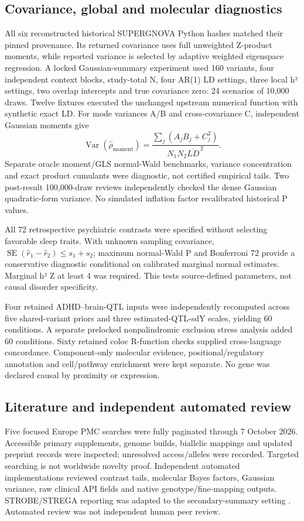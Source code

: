 \documentclass[11pt]{article}
\begin{document}
\subsection*{Covariance, global and molecular diagnostics}
All six reconstructed historical SUPERGNOVA Python hashes matched their pinned provenance. Its returned covariance uses full unweighted Z-product moments, while reported variance is selected by adaptive weighted eigenspace regression. A locked Gaussian-summary experiment used 160 variants, four independent context blocks, study-total N, four AR(1) LD settings, three local h² settings, two overlap intercepts and true covariance zero: 24 scenarios of 10,000 draws. Twelve fixtures executed the unchanged upstream numerical function with synthetic exact LD. For mode variances A/B and cross-covariance C, independent Gaussian moments give
\[\operatorname{Var}(\hat\rho_{\mathrm{moment}})=\frac{\sum_j(A_jB_j+C_j^2)}{N_1N_2\overline{LD}^{\,2}}.\]
Separate oracle moment/GLS normal-Wald benchmarks, variance concentration and exact product cumulants were diagnostic, not certified empirical tails. Two post-result 100,000-draw reviews independently checked the dense Gaussian quadratic-form variance. No simulated inflation factor recalibrated historical P values.

All 72 retrospective psychiatric contrasts were specified without selecting favorable sleep traits. With unknown sampling covariance, $\operatorname{SE}(\hat r_1-\hat r_2)\leq s_1+s_2$; maximum normal-Wald P and Bonferroni 72 provide a conservative diagnostic conditional on calibrated marginal normal estimates. Marginal h² Z at least 4 was required. This tests source-defined parameters, not causal disorder specificity.

Four retained ADHD--brain-QTL inputs were independently recomputed across five shared-variant priors and three estimated-QTL-sdY scales, yielding 60 conditions. A separate prelocked nonpalindromic exclusion stress analysis added 60 conditions. Sixty retained coloc R-function checks supplied cross-language concordance. Component-only molecular evidence, positional/regulatory annotation and cell/pathway enrichment were kept separate. No gene was declared causal by proximity or expression.

\subsection*{Literature and independent automated review}
Five focused Europe PMC searches were fully paginated through 7 October 2026. Accessible primary supplements, genome builds, biallelic mappings and updated preprint records were inspected; unresolved access/alleles were recorded. Targeted searching is not worldwide novelty proof. Independent automated implementations reviewed contrast tails, molecular Bayes factors, Gaussian variance, raw clinical API fields and native genotype/fine-mapping outputs. STROBE/STREGA reporting was adapted to the secondary-summary setting \cite{strobe,strega}. Automated review was not independent human peer review.
\end{document}
